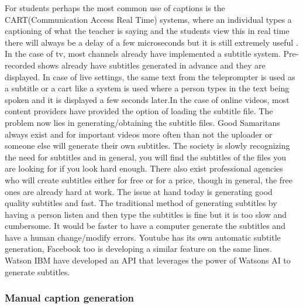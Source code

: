 \documentclass[sigconf]{acmart}
\begin{document}
For students perhaps the most common use of captions is the CART(Communication Access Real Time) systems, where an individual types a captioning of what the teacher is saying and the students view this in real time there will always be a delay of a few microseconds but it is still extremely useful \cite{Wikipedia2017} . In the case of tv, most channels already have implemented a subtitle system. Pre-recorded shows already have subtitles generated in advance and they are displayed. In case of live settings, the same text from the teleprompter is used as a subtitle or a cart like a system is used where a person types in the text being spoken and it is displayed a few seconds later.In the case of online videos, most content providers have provided the option of loading the subtitle file. The problem now lies in generating/obtaining the subtitle files. Good Samaritans always exist and for important videos more often than not the uploader or someone else will generate their own subtitles. The society is slowly recognizing the need for subtitles and in general, you will find the subtitles of the files you are looking for if you look hard enough. There also exist professional agencies who will create subtitles either for free or for a price, though in general, the free ones are already hard at work. 
\newline
The issue at hand today is generating good quality subtitles and fast. The traditional method of generating subtitles by having a person listen and then type the subtitles is fine but it is too slow and cumbersome. It would be faster to have a computer generate the subtitles and have a human change/modify errors. Youtube has its own automatic subtitle generation, Facebook too is developing a similar feature on the same lines. Watson IBM have developed an API that leverages the power of Watsons AI to generate subtitles.

\subsubsection{Manual caption generation}
\end{document}
